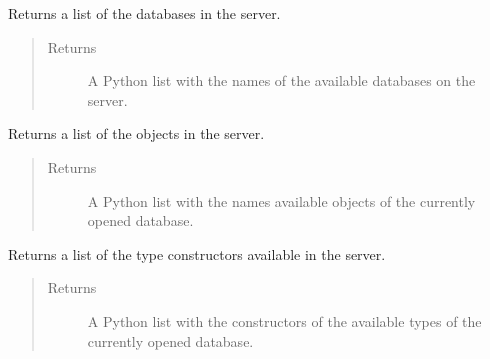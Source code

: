 \documentclass[letterpaper,10pt,english]{sphinxmanual}
\begin{document}
\begin{fulllineitems}
\begin{fulllineitems}
\begin{quote}
\begin{description}
\end{description}\end{quote}

\end{fulllineitems}


\begin{fulllineitems}
\label{\detokenize{index:secondodb.api.secondoapi.Connection.get_list_databases}}
Returns a list of the databases in the  server.
\begin{quote}\begin{description}
\item[{Returns}] \leavevmode
A Python list with the names of the available databases on the  server.

\end{description}\end{quote}

\end{fulllineitems}


\begin{fulllineitems}
\label{\detokenize{index:secondodb.api.secondoapi.Connection.get_list_objects}}
Returns a list of the objects in the  server.
\begin{quote}\begin{description}
\item[{Returns}] \leavevmode
A Python list with the names available objects of the currently opened database.

\end{description}\end{quote}

\end{fulllineitems}


\begin{fulllineitems}
\label{\detokenize{index:secondodb.api.secondoapi.Connection.get_list_type_constructors}}
Returns a list of the type constructors available in the  server.
\begin{quote}\begin{description}
\item[{Returns}] \leavevmode
A Python list with the constructors of the available types of the currently opened database.


\end{description}
\end{quote}
\end{fulllineitems}
\end{fulllineitems}
\end{document}
